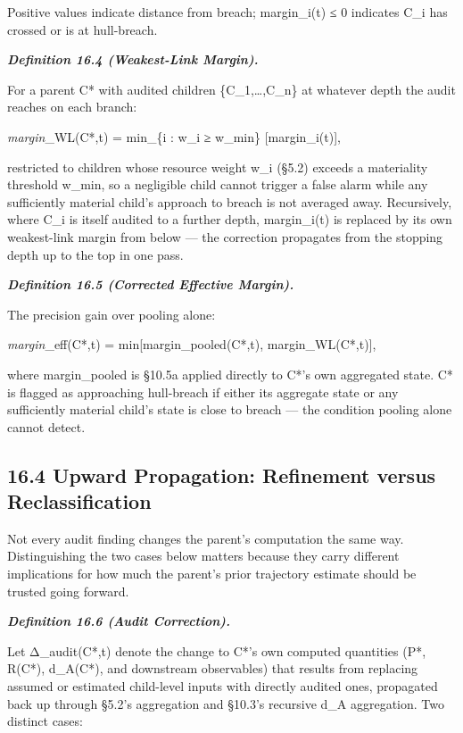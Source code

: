 \documentclass[
]{article}
\begin{document}
Positive values indicate distance from breach; margin\_i(t) ≤ 0
indicates C\_i has crossed or is at hull-breach.

\emph{\textbf{Definition 16.4 (Weakest-Link Margin).}}

For a parent C* with audited children \{C\_1,\ldots,C\_n\} at whatever
depth the audit reaches on each branch:

\emph{margin}\_WL(C*,t) = min\_\{i : w\_i ≥ w\_min\} {[}margin\_i(t){]},

restricted to children whose resource weight w\_i (§5.2) exceeds a
materiality threshold w\_min, so a negligible child cannot trigger a
false alarm while any sufficiently material child's approach to breach
is not averaged away. Recursively, where C\_i is itself audited to a
further depth, margin\_i(t) is replaced by its own weakest-link margin
from below --- the correction propagates from the stopping depth up to
the top in one pass.

\emph{\textbf{Definition 16.5 (Corrected Effective Margin).}}

The precision gain over pooling alone:

\emph{margin}\_eff(C*,t) = min{[}margin\_pooled(C*,t),
margin\_WL(C*,t){]},

where margin\_pooled is §10.5a applied directly to C*'s own aggregated
state. C* is flagged as approaching hull-breach if either its aggregate
state or any sufficiently material child's state is close to breach ---
the condition pooling alone cannot detect.

\hypertarget{upward-propagation-refinement-versus-reclassification}{%
\subsection{16.4 Upward Propagation: Refinement versus
Reclassification}\label{upward-propagation-refinement-versus-reclassification}}

Not every audit finding changes the parent's computation the same way.
Distinguishing the two cases below matters because they carry different
implications for how much the parent's prior trajectory estimate should
be trusted going forward.

\emph{\textbf{Definition 16.6 (Audit Correction).}}

Let Δ\_audit(C*,t) denote the change to C*'s own computed quantities
(P*, R(C*), d\_A(C*), and downstream observables) that results from
replacing assumed or estimated child-level inputs with directly audited
ones, propagated back up through §5.2's aggregation and §10.3's
recursive d\_A aggregation. Two distinct cases:
\end{document}
